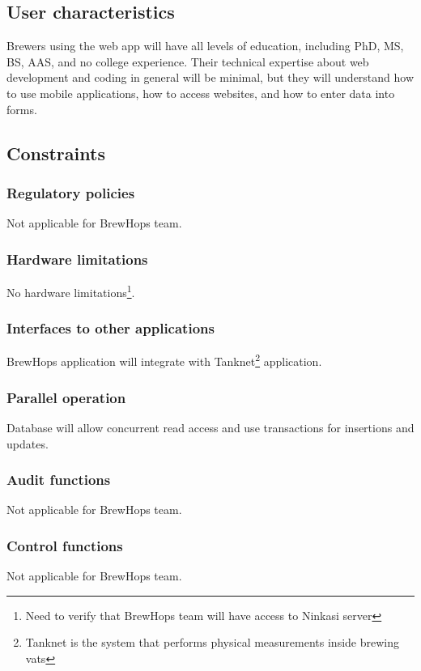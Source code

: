 \documentclass[draftclsnofoot,onecolumn,letterpaper,10pt,compsoc]{IEEEtran}
\begin{document}
	\subsection{User characteristics}
		Brewers using the web app will have all levels of education, including PhD, MS, BS, AAS, and no college experience.
		Their technical expertise about web development and coding in general will be minimal, but they will understand how to use mobile applications, how to access websites, and how to enter data into forms.

	\subsection{Constraints}
		\subsubsection{Regulatory policies}
        Not applicable for BrewHops team.

		\subsubsection{Hardware limitations}
        No hardware limitations\footnote{Need to verify that BrewHops team will have access to Ninkasi server}.

		\subsubsection{Interfaces to other applications}
        BrewHops application will integrate with Tanknet\footnote{Tanknet is the system that performs physical measurements inside brewing vats} application.

		\subsubsection{Parallel operation}
        Database will allow concurrent read access and use transactions for insertions and updates.

		\subsubsection{Audit functions}
        Not applicable for BrewHops team.

		\subsubsection{Control functions}
        Not applicable for BrewHops team.
\end{document}
